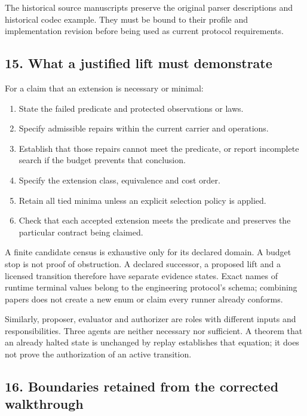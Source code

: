 \documentclass[
  11pt,
]{article}
\providecommand{\tightlist}{%
  \setlength{\itemsep}{0pt}\setlength{\parskip}{0pt}}
\begin{document}
The historical source manuscripts preserve the original parser
descriptions and historical codec example. They must be bound to their
profile and implementation revision before being used as current
protocol requirements.

\subsection{15. What a justified lift must
demonstrate}\label{what-a-justified-lift-must-demonstrate}

For a claim that an extension is necessary or minimal:

\begin{enumerate}
\def\labelenumi{\arabic{enumi}.}
\tightlist
\item
  State the failed predicate and protected observations or laws.
\item
  Specify admissible repairs within the current carrier and operations.
\item
  Establish that those repairs cannot meet the predicate, or report
  incomplete search if the budget prevents that conclusion.
\item
  Specify the extension class, equivalence and cost order.
\item
  Retain all tied minima unless an explicit selection policy is applied.
\item
  Check that each accepted extension meets the predicate and preserves
  the particular contract being claimed.
\end{enumerate}

A finite candidate census is exhaustive only for its declared domain. A
budget stop is not proof of obstruction. A declared successor, a
proposed lift and a licensed transition therefore have separate evidence
states. Exact names of runtime terminal values belong to the engineering
protocol's schema; combining papers does not create a new enum or claim
every runner already conforms.

Similarly, proposer, evaluator and authorizer are roles with different
inputs and responsibilities. Three agents are neither necessary nor
sufficient. A theorem that an already halted state is unchanged by
replay establishes that equation; it does not prove the authorization of
an active transition.

\subsection{16. Boundaries retained from the corrected
walkthrough}\label{boundaries-retained-from-the-corrected-walkthrough}
\end{document}
